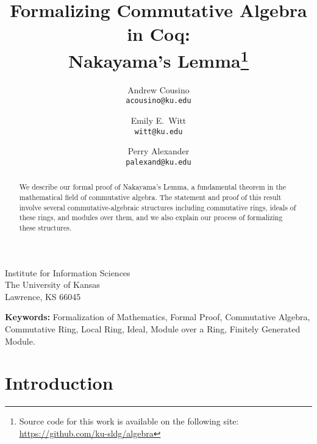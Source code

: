 \documentclass{article}
\begin{document}



\title{ 
Formalizing Commutative Algebra in Coq: \\ Nakayama's Lemma\thanks{Source code for this work is available on the following site: \url{https://github.com/ku-sldg/algebra}}
}


\date{}

\author{ 
	Andrew Cousino \\ {\tt acousino@ku.edu}
	\and 
	Emily E.\ Witt \\ {\tt witt@ku.edu}	
	\and 
	Perry Alexander \\ {\tt palexand@ku.edu}
}	
	
\maketitle	

\vspace{-.3cm}

{\large
\begin{center}
	Institute for Information Sciences \\
	The University of Kansas \\
	Lawrence, KS 66045
\end{center}
}



\begin{abstract}
We describe our formal proof of Nakayama's Lemma, a fundamental theorem in the mathematical field of commutative algebra. The statement and proof of this result involve several commutative-algebraic structures including commutative rings, ideals of these rings, and modules over them, and we also explain our process of formalizing these structures. 
\end{abstract}

\noindent \textbf{Keywords:}
Formalization of Mathematics,
Formal Proof,
Commutative Algebra,
Commutative Ring,
Local Ring,
Ideal,
Module over a Ring,
Finitely Generated Module. 


\section{Introduction}
\end{document}
